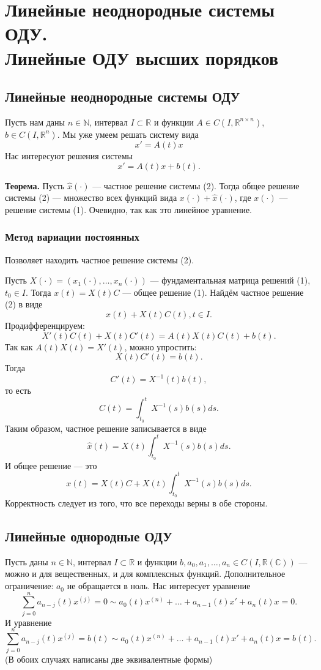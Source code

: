 \section{Линейные неоднородные системы ОДУ.\\ Линейные ОДУ высших порядков}
\subsection{Линейные неоднородные системы ОДУ}
\setcounter{equation}{0}
Пусть нам даны $n \in \mathbb N$, интервал $I \subset \mathbb R$ и функции $A \in C(I, \mathbb R^{n \times n})$, $b \in C(I, \mathbb R^n)$.
Мы уже умеем решать систему вида
\begin{equation}
    x' = A(t)x
\end{equation}
Нас интересуют решения системы
\begin{equation}
    x' = A(t)x + b(t).
\end{equation}

\textbf{Теорема.} Пусть $\widehat x(\cdot)$ --- частное решение системы (2).
Тогда общее решение системы (2) --- множество всех функций вида $x(\cdot) + \widehat x(\cdot)$, где $x(\cdot)$ --- решение системы (1).
Очевидно, так как это линейное уравнение.

\subsubsection{Метод вариации постоянных}
Позволяет находить частное решение системы (2).

Пусть $X(\cdot) = (x_1(\cdot), \dots, x_n(\cdot))$ --- фундаментальная матрица решений (1), $t_0 \in I$.
Тогда $x(t) = X(t) C$ --- общее решение (1).
Найдём частное решение (2) в виде
\[
    x(t) + X(t) C(t), t \in I.
\]
Продифференцируем:
\[
    X'(t) C(t) + X(t) C'(t) = A(t) X(t) C(t) + b(t).
\]
Так как $A(t) X(t) = X'(t)$, можно упростить:
\[
    X(t) C'(t) = b(t).
\]
Тогда
\[
    C'(t) = X^{-1}(t) b(t),
\]
то есть
\[
    C(t) = \int_{t_0}^{t} X^{-1}(s) b(s) ds.
\]
Таким образом, частное решение записывается в виде
\[
    \widehat x(t) = X(t) \int_{t_0}^{t} X^{-1}(s) b(s) ds.
\]
И общее решение --- это
\[
    x(t) = X(t) C + X(t) \int_{t_0}^{t} X^{-1}(s) b(s) ds.
\]
Корректность следует из того, что все переходы верны в обе стороны.

\subsection{Линейные однородные ОДУ}
Пусть даны $n \in \mathbb N$, интервал $I \subset \mathbb R$ и функции $b, a_0, a_1, \dots, a_n \in C(I, \mathbb R (\mathbb C))$ --- можно и для вещественных, и для комплексных функций.
Дополнительное ограничение: $a_0$ не обращается в ноль.
Нас интересует уравнение
\begin{equation}
    \sum_{j=0}^{n} a_{n-j}(t) x^{(j)} = 0 \sim a_0(t) x^{(n)} + \dots + a_{n-1}(t) x' + a_n(t) x = 0.
\end{equation}
И уравнение
\begin{equation}
    \sum_{j=0}^{n} a_{n-j}(t) x^{(j)} = b(t) \sim a_0(t) x^{(n)} + \dots + a_{n-1}(t) x' + a_n(t) x = b(t).
\end{equation}
(В обоих случаях написаны две эквивалентные формы)

